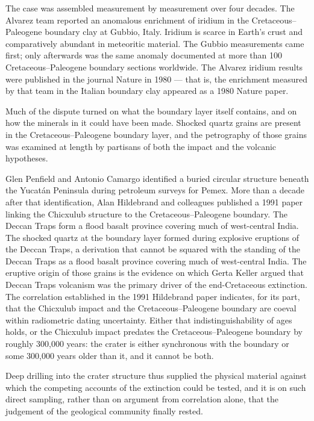 The case was assembled measurement by measurement over four decades. The Alvarez team reported an anomalous enrichment of iridium in the Cretaceous–Paleogene boundary clay at Gubbio, Italy. Iridium is scarce in Earth's crust and comparatively abundant in meteoritic material. The Gubbio measurements came first; only afterwards was the same anomaly documented at more than 100 Cretaceous–Paleogene boundary sections worldwide. The Alvarez iridium results were published in the journal Nature in 1980 — that is, the enrichment measured by that team in the Italian boundary clay appeared as a 1980 Nature paper.

Much of the dispute turned on what the boundary layer itself contains, and on how the minerals in it could have been made. Shocked quartz grains are present in the Cretaceous–Paleogene boundary layer, and the petrography of those grains was examined at length by partisans of both the impact and the volcanic hypotheses.

Glen Penfield and Antonio Camargo identified a buried circular structure beneath the Yucatán Peninsula during petroleum surveys for Pemex. More than a decade after that identification, Alan Hildebrand and colleagues published a 1991 paper linking the Chicxulub structure to the Cretaceous–Paleogene boundary. The Deccan Traps form a flood basalt province covering much of west-central India. The shocked quartz at the boundary layer formed during explosive eruptions of the Deccan Traps, a derivation that cannot be squared with the standing of the Deccan Traps as a flood basalt province covering much of west-central India. The eruptive origin of those grains is the evidence on which Gerta Keller argued that Deccan Traps volcanism was the primary driver of the end-Cretaceous extinction. The correlation established in the 1991 Hildebrand paper indicates, for its part, that the Chicxulub impact and the Cretaceous–Paleogene boundary are coeval within radiometric dating uncertainty. Either that indistinguishability of ages holds, or the Chicxulub impact predates the Cretaceous–Paleogene boundary by roughly 300,000 years: the crater is either synchronous with the boundary or some 300,000 years older than it, and it cannot be both.

 Deep drilling into the crater structure thus supplied the physical material against which the competing accounts of the extinction could be tested, and it is on such direct sampling, rather than on argument from correlation alone, that the judgement of the geological community finally rested.
